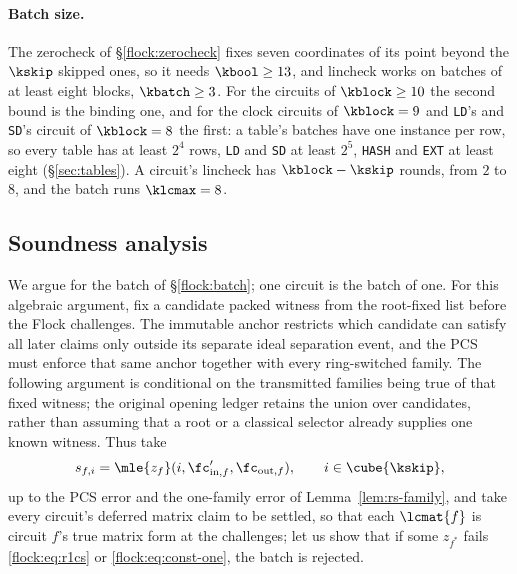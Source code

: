 \paragraph{Batch size.} The zerocheck of \S\ref{flock:zerocheck} fixes seven coordinates of its point beyond the $\kskip$ skipped ones, so it needs $\kbool\ge13$, and lincheck works on batches of at least eight blocks, $\kbatch\ge3$. For the circuits of $\kblock\ge10$ the second bound is the binding one, and for the clock circuits of $\kblock=9$ and \texttt{LD}'s and \texttt{SD}'s circuit of $\kblock=8$ the first: a table's batches have one instance per row, so every table has at least $2^{4}$ rows, \texttt{LD} and \texttt{SD} at least $2^{5}$, \texttt{HASH} and \texttt{EXT} at least eight (\S\ref{sec:tables}). A circuit's lincheck has $\kblock-\kskip$ rounds, from $2$ to $8$, and the batch runs $\klcmax=8$.

\subsection{Soundness analysis}\label{flock:soundness}

We argue for the batch of \S\ref{flock:batch}; one circuit is the batch of one. For this algebraic argument, fix a candidate packed witness from the root-fixed list before the Flock challenges. The immutable anchor restricts which candidate can satisfy all later claims only outside its separate ideal separation event, and the PCS must enforce that same anchor together with every ring-switched family. The following argument is conditional on the transmitted families being true of that fixed witness; the original opening ledger retains the union over candidates, rather than assuming that a root or a classical selector already supplies one known witness. Thus take
\[
s_{f,i}=\mle{z_f}(i,\fc'_{\mathrm{in},f},\fc_{\mathrm{out},f}),\qquad i\in\cube{\kskip},
\]
up to the PCS error and the one-family error of Lemma~\ref{lem:rs-family}, and take every circuit's deferred matrix claim to be settled, so that each $\lcmat{f}$ is circuit $f$'s true matrix form at the challenges; let us show that if some $z_{f^\ast}$ fails \eqref{flock:eq:r1cs} or \eqref{flock:eq:const-one}, the batch is rejected.

